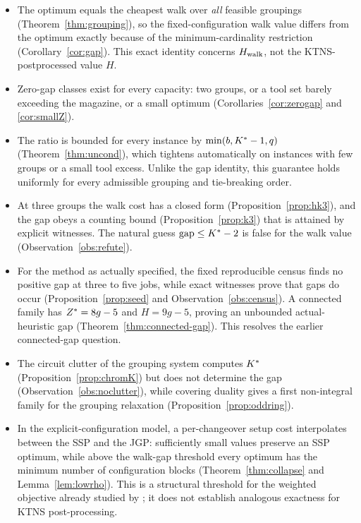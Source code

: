 \begin{itemize}[topsep=3pt,itemsep=2pt]
  \item The optimum equals the cheapest walk over \emph{all} feasible groupings
  (Theorem~\ref{thm:grouping}), so the fixed-configuration walk value differs from the
  optimum exactly because of the minimum-cardinality restriction
  (Corollary~\ref{cor:gap}). This exact identity concerns $H_{\mathrm{walk}}$, not the
  KTNS-postprocessed value $H$.
  \item Zero-gap classes exist for every capacity: two groups, or a tool set barely
  exceeding the magazine, or a small optimum (Corollaries~\ref{cor:zerogap} and
  \ref{cor:smallZ}).
  \item The ratio is bounded for every instance by
  $\min(b,K^{\ast}-1,q)$ (Theorem~\ref{thm:uncond}), which tightens automatically on
  instances with few groups or a small tool excess. Unlike the gap identity, this
  guarantee holds uniformly for every admissible grouping and tie-breaking order.
  \item At three groups the walk cost has a closed form
  (Proposition~\ref{prop:hk3}), and the gap obeys a counting bound
  (Proposition~\ref{prop:k3}) that is attained by explicit witnesses. The natural
  guess $\mathrm{gap}\le K^{\ast}-2$ is false for the walk value
  (Observation~\ref{obs:refute}).
  \item For the method as actually specified, the fixed reproducible census finds no
  positive gap at three to five jobs, while exact witnesses prove that gaps do occur
  (Proposition~\ref{prop:seed} and Observation~\ref{obs:census}). A connected family
  has $Z^{\ast}=8g-5$ and $H=9g-5$, proving an unbounded actual-heuristic gap
  (Theorem~\ref{thm:connected-gap}). This resolves the earlier connected-gap question.
  \item The circuit clutter of the grouping system computes $K^{\ast}$
  (Proposition~\ref{prop:chromK}) but does not determine the gap
  (Observation~\ref{obs:noclutter}), while covering duality gives a first
  non-integral family for the grouping relaxation
  (Proposition~\ref{prop:oddring}).
  \item In the explicit-configuration model, a per-changeover setup cost interpolates
  between the SSP and the JGP: sufficiently small values preserve an SSP optimum, while
  above the walk-gap threshold every optimum has the minimum number of configuration
  blocks (Theorem~\ref{thm:collapse} and Lemma~\ref{lem:lowrho}). This is a structural
  threshold for the weighted objective already studied by \citet{Salonen2006}; it does
  not establish analogous exactness for KTNS post-processing.
\end{itemize}

